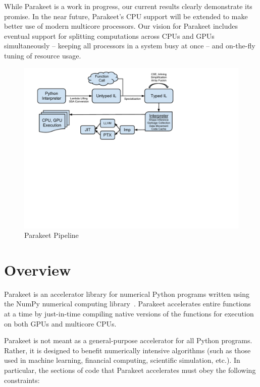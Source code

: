 \documentclass[10pt,twocolumn]{article}
\begin{document}
While Parakeet is a work in progress, our current results clearly demonstrate its promise.  In the near future, Parakeet's CPU support will be extended to make better use of modern multicore processors.  Our vision for Parakeet includes eventual support for splitting computations across CPUs and GPUs simultaneously -- keeping all processors in a system busy at once -- and on-the-fly tuning of resource usage.

\begin{figure}[t!bh]
\begin{center}
\leavevmode
\includegraphics[scale=0.6, trim=0pt 310pt 140pt 80pt]{ParakeetNumPyOverview.pdf}
\end{center}
\caption{Parakeet Pipeline}
\label{fig:overview}
\end{figure}

\section{Overview}
\label{overview}
Parakeet is an accelerator library for numerical Python programs written using the NumPy numerical computing library~\cite{Oliphant07}.  Parakeet accelerates entire functions at a time by just-in-time compiling native versions of the functions for execution on both GPUs and multicore CPUs.

Parakeet is not meant as a general-purpose accelerator for all Python programs.  Rather, it is designed to benefit numerically intensive algorithms (such as those used in machine learning, financial computing, scientific simulation, etc.).  In particular, the sections of code that Parakeet accelerates must obey the following constraints:
\end{document}
